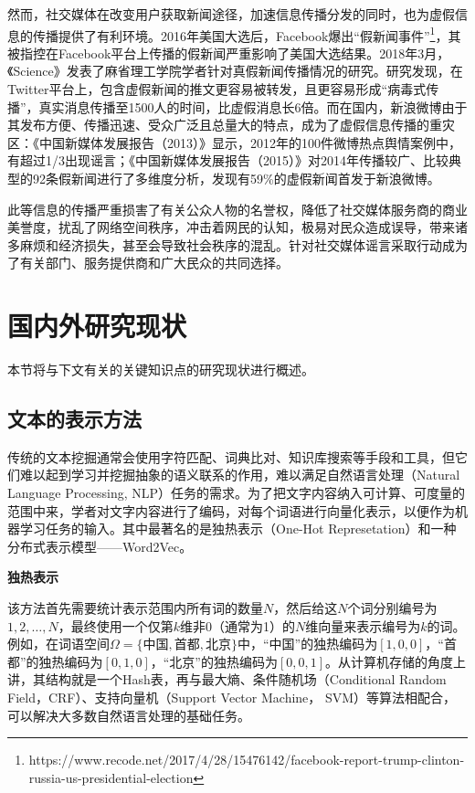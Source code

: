 \documentclass[a4paper,oneside,12pt]{book}
\begin{document}
然而，社交媒体在改变用户获取新闻途径，加速信息传播分发的同时，也为虚假信息的传播提供了有利环境。2016年美国大选后，Facebook爆出“假新闻事件”\footnote{https://www.recode.net/2017/4/28/15476142/facebook-report-trump-clinton-russia-us-presidential-election}，其被指控在Facebook平台上传播的假新闻严重影响了美国大选结果。2018年3月，《Science》发表了麻省理工学院学者针对真假新闻传播情况的研究\cite{false_news_spread_2018}。研究发现，在Twitter平台上，包含虚假新闻的推文更容易被转发，且更容易形成“病毒式传播”，真实消息传播至1500人的时间，比虚假消息长6倍。而在国内，新浪微博由于其发布方便、传播迅速、受众广泛且总量大的特点，成为了虚假信息传播的重灾区：《中国新媒体发展报告（2013）》\cite{唐绪军2013中国新媒体发展报告}显示，2012年的100件微博热点舆情案例中，有超过1/3出现谣言；《中国新媒体发展报告（2015）》\cite{唐绪军2015中国新媒体发展报告}对2014年传播较广、比较典型的92条假新闻进行了多维度分析，发现有59\%的虚假新闻首发于新浪微博。

此等信息的传播严重损害了有关公众人物的名誉权，降低了社交媒体服务商的商业美誉度，扰乱了网络空间秩序，冲击着网民的认知，极易对民众造成误导，带来诸多麻烦和经济损失，甚至会导致社会秩序的混乱。针对社交媒体谣言采取行动成为了有关部门、服务提供商和广大民众的共同选择。

\section{国内外研究现状}
本节将与下文有关的关键知识点的研究现状进行概述。
\subsection{文本的表示方法}
传统的文本挖掘通常会使用字符匹配、词典比对、知识库搜索等手段和工具，但它们难以起到学习并挖掘抽象的语义联系的作用，难以满足自然语言处理（Natural Language Processing, NLP）任务的需求。为了把文字内容纳入可计算、可度量的范围中来，学者对文字内容进行了编码，对每个词语进行向量化表示，以便作为机器学习任务的输入。其中最著名的是独热表示（One-Hot Represetation）和一种分布式表示模型——Word2Vec。

\textbf{独热表示}

该方法首先需要统计表示范围内所有词的数量$N$，然后给这$N$个词分别编号为$1,2,\ldots,N$，最终使用一个仅第$k$维非0（通常为1）的$N$维向量来表示编号为$k$的词。例如，在词语空间$\Omega=\{\mbox{中国}, \mbox{首都}, \mbox{北京}\}$中，“中国”的独热编码为$[1,0,0]$，“首都”的独热编码为$[0,1,0]$，“北京”的独热编码为$[0,0,1]$。从计算机存储的角度上讲，其结构就是一个Hash表，再与最大熵、条件随机场（Conditional Random Field，CRF）、支持向量机（Support Vector Machine， SVM）等算法相配合，可以解决大多数自然语言处理的基础任务。
\end{document}
